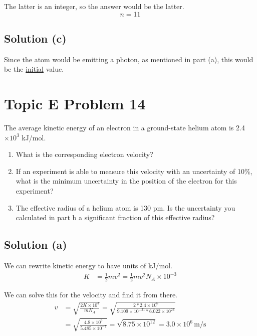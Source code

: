 \documentclass[10pt]{article}
\newcommand{\E}[1]{\times 10^{#1}}
\newcommand{\U}[1]{\underline{#1}}
\begin{document}
            The latter is an integer, so the answer would be the latter.
            \[\boxed{n = 11}\]

        \subsection{Solution (c)}
            Since the atom would be emitting a photon, as mentioned in part (a), this would be the \U{initial} value.

    \pagebreak
    \section{Topic E Problem 14}
        The average kinetic energy of an electron in a ground-state helium atom is 2.4$\E{3}$ kJ/mol.
        \begin{enumerate}[label=\alph*)]
            \item   What is the corresponding electron velocity?
            \item   If an experiment is able to measure this velocity with an uncertainty of 10\%, what is the minimum uncertainty in the position of the electron for this experiment?
            \item   The effective radius of a helium atom is 130 pm. Is the uncertainty you calculated in part b a significant fraction of this effective radius?
        \end{enumerate}
        
        \subsection{Solution (a)}
            We can rewrite kinetic energy to have units of \unit{\kilo\joule/\mole}.
            \begin{align}
                K   &=  \frac{1}{2}mv^2
                    =   \frac{1}{2}mv^2 N_A \times 10^{-3}
            \end{align}

            We can solve this for the velocity and find it from there.
            \begin{align}
                v   &=  \sqrt{\frac{2K\E{3}}{mN_A}}
                    =   \sqrt{\frac{2 * 2.4\E{6}}{9.109\E{-31} * 6.022\E{23}}}\\
                    &=  \sqrt{\frac{4.8\E{6}}{5.485\E{-7}}}
                    =   \sqrt{8.75\E{12}}
                    =   \boxed{3.0\E{6}\,\unit{\meter/\second}}
            \end{align}
\end{document}
